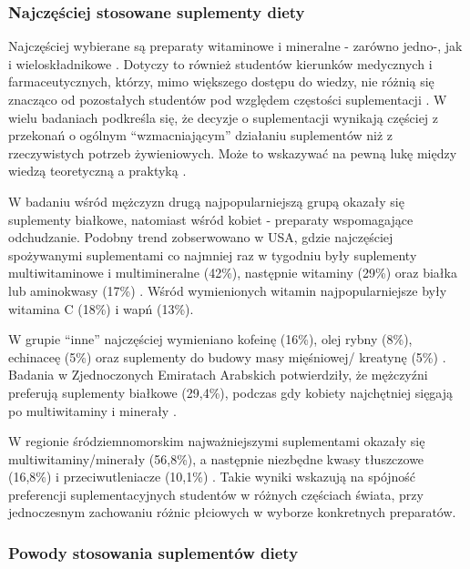 \subsubsection{Najczęściej stosowane suplementy diety}

Najczęściej wybierane są preparaty witaminowe i mineralne - zarówno jedno-, jak i wieloskładnikowe \cite{kobayashi2017prevalence}. Dotyczy to również studentów kierunków medycznych i farmaceutycznych, którzy, mimo większego dostępu do wiedzy, nie różnią się znacząco od pozostałych studentów pod względem częstości suplementacji \cite{serbian-undergraduate}.
W wielu badaniach podkreśla się, że decyzje o suplementacji wynikają częściej z przekonań o ogólnym \enquote{wzmacniającym} działaniu suplementów niż z rzeczywistych potrzeb żywieniowych. Może to wskazywać na pewną lukę między wiedzą teoretyczną a praktyką \cite{knowledge-and-use,serbian-undergraduate}.

W badaniu \cite{kobayashi2017prevalence} wśród mężczyzn drugą najpopularniejszą grupą okazały się suplementy białkowe, natomiast wśród kobiet - preparaty wspomagające odchudzanie. Podobny trend zobserwowano w USA, gdzie najczęściej spożywanymi suplementami co najmniej raz w tygodniu były suplementy multiwitaminowe i multimineralne (42\%), następnie witaminy (29\%) oraz białka lub aminokwasy (17\%) \cite{lieberman2015patterns}. Wśród wymienionych witamin najpopularniejsze były witamina C (18\%) i wapń (13\%).

W grupie \enquote{inne} najczęściej wymieniano kofeinę (16\%), olej rybny (8\%), echinaceę (5\%) oraz suplementy do budowy masy mięśniowej/ kreatynę (5\%) \cite{lieberman2015patterns}. Badania w Zjednoczonych Emiratach Arabskich potwierdziły, że mężczyźni preferują suplementy białkowe (29,4\%), podczas gdy kobiety najchętniej sięgają po multiwitaminy i minerały \cite{radwan2019prevalence}.  

W regionie śródziemnomorskim najważniejszymi suplementami okazały się multiwitaminy/minerały (56,8\%), a następnie niezbędne kwasy tłuszczowe (16,8\%) i przeciwutleniacze (10,1\%) \cite{radwan2019prevalence}. Takie wyniki wskazują na spójność preferencji suplementacyjnych studentów w różnych częściach świata, przy jednoczesnym zachowaniu różnic płciowych w wyborze konkretnych preparatów.

\subsubsection{Powody stosowania suplementów diety}

